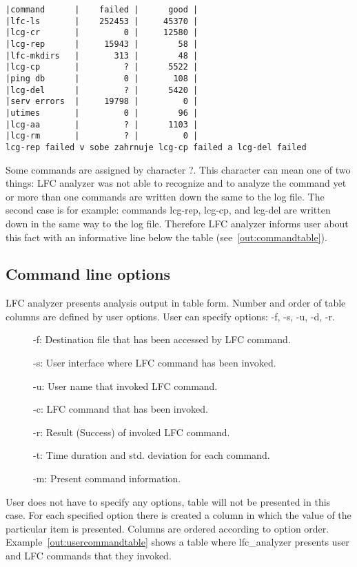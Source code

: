 \documentclass[a4paper, 11pt]{article} %
\begin{document}
\begin{lstlisting}[style=cli, label={out:commandtable}, caption={lfc\_analyzer -i logfile}]
|command      |    failed |      good |
|lfc-ls       |    252453 |     45370 |
|lcg-cr       |         0 |     12580 |
|lcg-rep      |     15943 |        58 |
|lfc-mkdirs   |       313 |        48 |
|lcg-cp       |         ? |      5522 |
|ping db      |         0 |       108 |
|lcg-del      |         ? |      5420 |
|serv errors  |     19798 |         0 |
|utimes       |         0 |        96 |
|lcg-aa       |         ? |      1103 |
|lcg-rm       |         ? |         0 |
lcg-rep failed v sobe zahrnuje lcg-cp failed a lcg-del failed
\end{lstlisting}

Some commands are assigned by character ?. This character can mean one of two things: LFC analyzer was not able to recognize and to analyze the command yet or more than one commands are written down the same to the log file. The second case is for example: commands lcg-rep, lcg-cp, and lcg-del are written down in the same way to the log file. Therefore LFC analyzer informs user about this fact with an informative line below the table (see~\ref{out:commandtable}).

\subsection{Command line options}

LFC analyzer presents analysis output in table form. Number and order of table columns are defined by user options. User can specify options: -f, -s, -u, -d, -r. 

\begin{description}
    \item[] -f: Destination file that has been accessed by LFC command.
    \item[] -s: User interface where LFC command has been invoked. 
    \item[] -u: User name that invoked LFC command.
    \item[] -c: LFC command that has been invoked.
    \item[] -r: Result (Success) of invoked LFC command.
    \item[] -t: Time duration and std. deviation for each command.
    \item[] -m: Present command information.
\end{description}

User does not have to specify any options, table will not be presented in this case. For each specified option there is created a column in which the value of the particular item is presented. Columns are ordered according to option order. Example~\ref{out:usercommandtable} shows a table where lfc\_analyzer presents user and LFC commands that they invoked.
\end{document}
